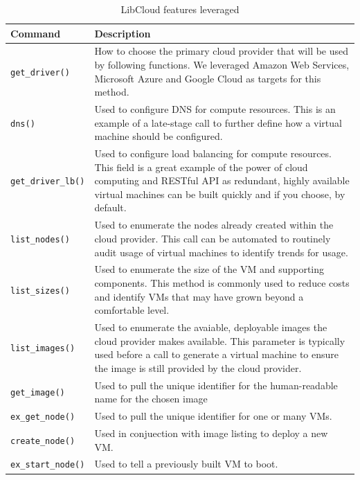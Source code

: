 \begin{table}[htb]
\centering
\caption{LibCloud features leveraged}\label{t:libcloudtable}
\begin{tabular} {p{2.5cm}|p{5cm}}
Command & Description\\
\toprule
\verb|get_driver()| & How to choose the primary cloud provider that will be
used by following functions. We leveraged Amazon Web Services, Microsoft Azure
and Google Cloud as targets for this method.\\
\verb|dns()| & Used to configure DNS for compute resources. This is an example
of a
late-stage call to further define how a virtual machine should be configured.\\

\verb|get_driver_lb()| & Used to configure load balancing for compute
resources. This
field is a great example of the power of cloud computing and RESTful API as
redundant, highly available virtual machines can be built quickly and if you
choose, by default.\\

\verb|list_nodes()| & Used to enumerate the nodes already created within the
cloud
provider. This call can be automated to routinely audit usage of virtual
machines to identify trends for usage.\\

\verb|list_sizes()| & Used to enumerate the size of the VM and supporting
components.
This method is commonly used to reduce costs and identify VMs that may have
grown beyond a comfortable level.\\

\verb|list_images()| & Used to enumerate the avaiable, deployable images the
cloud
provider makes available. This parameter is typically used before a call to
generate a virtual machine to ensure the image is still provided by the cloud
provider.\\

\verb|get_image()| & Used to pull the unique identifier for the human-readable
name
for the chosen image\\

\verb|ex_get_node()| & Used to pull the unique identifier for one or many
VMs.\\

\verb|create_node()| & Used in conjuection with image listing to deploy a new
VM.\\

\verb|ex_start_node()| & Used to tell a previously built VM to boot.\\


\end{tabular}
\end{table}
